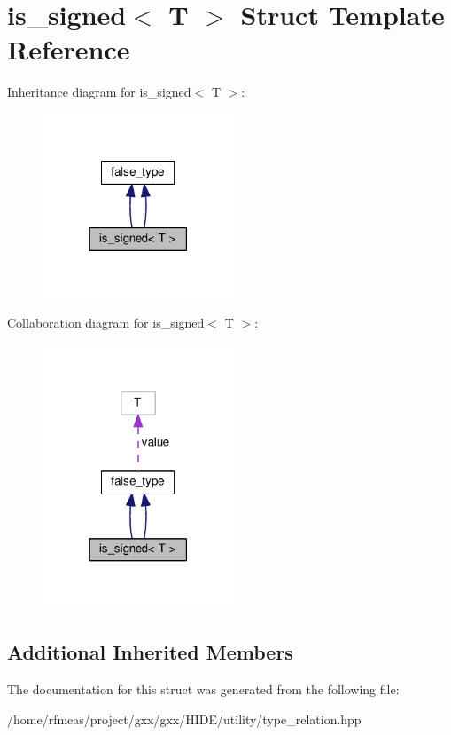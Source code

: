 \hypertarget{structis__signed}{}\section{is\+\_\+signed$<$ T $>$ Struct Template Reference}
\label{structis__signed}


Inheritance diagram for is\+\_\+signed$<$ T $>$\+:
\nopagebreak
\begin{figure}[H]
\begin{center}
\leavevmode
\includegraphics[width=162pt]{structis__signed__inherit__graph}
\end{center}
\end{figure}


Collaboration diagram for is\+\_\+signed$<$ T $>$\+:
\nopagebreak
\begin{figure}[H]
\begin{center}
\leavevmode
\includegraphics[width=162pt]{structis__signed__coll__graph}
\end{center}
\end{figure}
\subsection*{Additional Inherited Members}


The documentation for this struct was generated from the following file\+:\begin{DoxyCompactItemize}
\item 
/home/rfmeas/project/gxx/gxx/\+H\+I\+D\+E/utility/type\+\_\+relation.\+hpp\end{DoxyCompactItemize}
